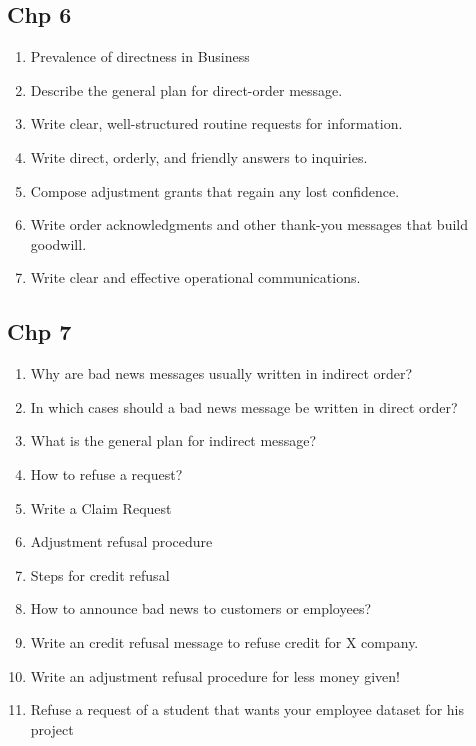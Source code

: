 \documentclass[11pt]{article}
\begin{document}
\subsection{Chp 6}
\label{sec:orgd72e4da}
\begin{enumerate}
\item Prevalence of directness in Business
\item Describe the general plan for direct-order message.
\item Write clear, well-structured routine requests for information.
\item Write direct, orderly, and friendly answers to inquiries.
\item Compose adjustment grants that regain any lost confidence.
\item Write order acknowledgments and other thank-you messages that build goodwill.
\item Write clear and effective operational communications.
\end{enumerate}
\subsection{Chp 7}
\label{sec:orgabfb87d}
\begin{enumerate}
\item Why are bad news messages usually written in indirect order?
\item In which cases should a bad news message be written in direct order?
\item What is the general plan for indirect message?
\item How to refuse a request?
\item Write a Claim Request
\item Adjustment refusal procedure
\item Steps for credit refusal
\item How to announce bad news to customers or employees?
\item Write an credit refusal message to refuse credit for X company.
\item Write an adjustment refusal procedure for less money given!
\item Refuse a request of a student that wants your employee dataset for his project
\end{enumerate}
\end{document}
